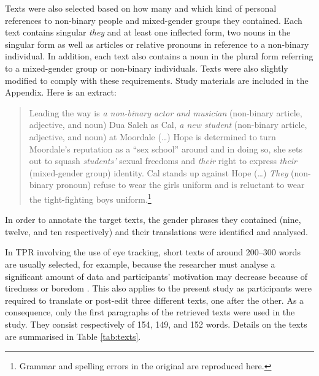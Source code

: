 Texts were also selected based on how many and which kind of personal references to non-binary people and mixed-gender groups they contained. Each text contains singular \textit{they} and at least one inflected form, two nouns in the singular form as well as articles or relative pronouns in reference to a non-binary individual. In addition, each text also contains a noun in the plural form referring to a mixed-gender group or non-binary individuals. Texts were also slightly modified to comply with these requirements. Study materials are included in the Appendix. Here is an extract:

\begin{quote}
Leading the way is \textit{a non-binary actor and musician} (non-binary article, adjective, and noun) Dua Saleh as Cal, \textit{a new student} (non-binary article, adjective, and noun) at Moordale (…) Hope is determined to turn Moordale's reputation as a ``sex school'' around and in doing so, she sets out to squash \textit{students'} sexual freedoms and \textit{their} right to express \textit{their} (mixed-gender group) identity. Cal stands up against Hope (…) \textit{They} (non-binary pronoun) refuse to wear the girls uniform and is reluctant to wear the tight-fighting boys uniform.\footnote{Grammar and spelling errors in the original are reproduced here.}
\end{quote}

In order to annotate the target texts, the gender phrases they contained (nine, twelve, and ten respectively) and their translations were identified and analysed.

In TPR involving the use of eye tracking, short texts of around 200--300 words are usually selected, for example, because the researcher must analyse a significant amount of data and participants’ motivation may decrease because of tiredness or boredom \citep[261]{o2009eye}. This also applies to the present study as participants were required to translate or post-edit three different texts, one after the other. As a consequence, only the first paragraphs of the retrieved texts were used in the study. They consist respectively of 154, 149, and 152 words. Details on the texts are summarised in Table \ref{tab:texts}.

\begin{table}[t]
    \caption{Details on translation and PE materials}


    \label{tab:texts}
\end{table}

